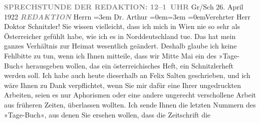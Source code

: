 \begin{ledgroupsized}[t]{13cm}
           \pstart
           \noindent{}\centering{}\textcolor{gray}{\textbf{SPRECHSTUNDE DER REDAKTION: 12–1 UHR}}\pend
           \pstart
           \noindent{}Gr/Sch\pend
           \pstart
           \centering{}26. April 1922\pend
           \pstart
           \textcolor{gray}{\textbf{\emph{REDAKTION}}}\pend
           \pstart
           Herrn\pend
           \leftskip=3em{}\pstart
           \noindent{}Dr. Arthur \pend
           \leftskip=0em{}\leftskip=3em{}\pstart
           \pend
           \leftskip=0em{}\pstart\center{}Verehrter Herr \introOben{}Doktor\introOben{}
                  Schnitzler!\pend\pstart
           Sie wissen vielleicht, dass ich mich in Wien nie so
               sehr als Österreicher gefühlt habe, wie ich es in
                  Norddeutschland tue. Das hat mein ganzes
               Verhältnis zur Heimat wesentlich geändert. Deshalb glaube ich keine Fehlbitte zu tun,
               wenn ich Ihnen mitteile, dass wir Mitte Mai ein \label{K_L02378_1v}\label{K_L02378_1h} des »Tage-Buch«
               herausgeben wollen, das ein österreichisches Heft,
               ein Schnitzlerheft werden soll. Ich habe auch heute dieserhalb an Felix Salten geschrieben, und ich wäre Ihnen zu Dank
               verpflichtet, wenn Sie mir dafür eine Ihrer ungedruckten Arbeiten, seien es nur
               Aphorismen oder eine andere ungerecht verschollene Arbeit aus früheren Zeiten,
               überlassen wollten. Ich sende Ihnen die letzten Nummern des »Tage-Buch«, aus denen Sie ersehen wollen, dass die Zeitschrift die

\end{ledgroupsized}
